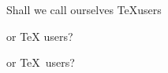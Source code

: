 \documentclass{article}
\begin{document}
Shall we call ourselves
\TeX users

or \TeX{} users?

or \TeX\ users?
\end{document}
